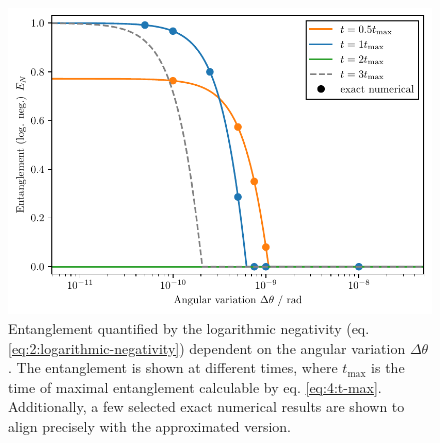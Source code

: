 \begin{figure}[!htbp]
  \centering
  \includegraphics[width=\textwidth]{./../figures/theta-variance/EN-delta-theta.pdf}
  \caption{Entanglement quantified by the logarithmic negativity (eq. \eqref{eq:2:logarithmic-negativity}) dependent on the angular variation $\Delta\theta$. The entanglement is shown at different times, where $t_\mathrm{max}$ is the time of maximal entanglement calculable by eq. \eqref{eq:4:t-max}. Additionally, a few selected exact numerical results are shown to align precisely with the approximated version.}
  \label{fig:4:EN-delta-theta}
\end{figure}




